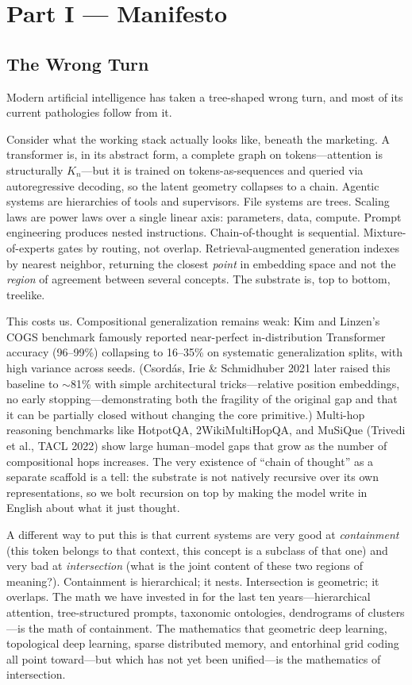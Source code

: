 \documentclass[11pt,a4paper]{article}
\begin{document}
\section{Part I --- Manifesto}

\subsection{The Wrong Turn}

Modern artificial intelligence has taken a tree-shaped wrong turn, and most of its current pathologies follow from it.

Consider what the working stack actually looks like, beneath the marketing. A transformer is, in its abstract form, a complete graph on tokens---attention is structurally $K_n$---but it is trained on tokens-as-sequences and queried via autoregressive decoding, so the latent geometry collapses to a chain. Agentic systems are hierarchies of tools and supervisors. File systems are trees. Scaling laws are power laws over a single linear axis: parameters, data, compute. Prompt engineering produces nested instructions. Chain-of-thought is sequential. Mixture-of-experts gates by routing, not overlap. Retrieval-augmented generation indexes by nearest neighbor, returning the closest \emph{point} in embedding space and not the \emph{region} of agreement between several concepts. The substrate is, top to bottom, treelike.

This costs us. Compositional generalization remains weak: Kim and Linzen's COGS benchmark famously reported near-perfect in-distribution Transformer accuracy (96--99\%) collapsing to 16--35\% on systematic generalization splits, with high variance across seeds. (Csord\'as, Irie \& Schmidhuber 2021 later raised this baseline to $\sim$81\% with simple architectural tricks---relative position embeddings, no early stopping---demonstrating both the fragility of the original gap and that it can be partially closed without changing the core primitive.) Multi-hop reasoning benchmarks like HotpotQA, 2WikiMultiHopQA, and MuSiQue (Trivedi et al., TACL 2022) show large human--model gaps that grow as the number of compositional hops increases. The very existence of ``chain of thought'' as a separate scaffold is a tell: the substrate is not natively recursive over its own representations, so we bolt recursion on top by making the model write in English about what it just thought.

A different way to put this is that current systems are very good at \emph{containment} (this token belongs to that context, this concept is a subclass of that one) and very bad at \emph{intersection} (what is the joint content of these two regions of meaning?). Containment is hierarchical; it nests. Intersection is geometric; it overlaps. The math we have invested in for the last ten years---hierarchical attention, tree-structured prompts, taxonomic ontologies, dendrograms of clusters---is the math of containment. The mathematics that geometric deep learning, topological deep learning, sparse distributed memory, and entorhinal grid coding all point toward---but which has not yet been unified---is the mathematics of intersection.
\end{document}
